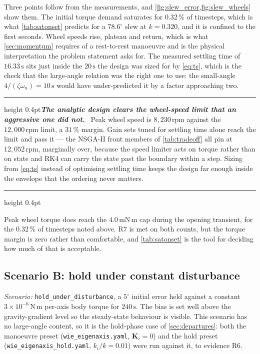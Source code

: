 \documentclass[conference,10pt,a4paper]{IEEEtran}
\newcommand{\remarkrule}{\par\nobreak\vspace{2pt}%
  \hrule height 0.4pt\vspace{4pt}\nobreak}
\newenvironment{keybox}[1][Result]
  {\par\medskip\remarkrule\noindent\small\textbf{\textit{#1.}}\ \ignorespaces}
  {\par\vspace{3pt}\hrule height 0.4pt\par\medskip\ignorespacesafterend}
\newcommand{\mat}[1]{\bm{#1}}
\newcommand{\unit}[1]{\ensuremath{\,\mathrm{#1}}}
\begin{document}
Three points follow from the measurements, and
\cref{fig:slew_error,fig:slew_wheels} show them. The initial torque demand
saturates for $0.32\,\%$ of timesteps, which is what \cref{tab:satonset}
predicts for a $78.6^\circ$ slew at $k=0.320$, and it is confined to the first
seconds. Wheel speeds rise, plateau and return, which is what
\cref{sec:momentum} requires of a rest-to-rest manoeuvre and is the physical
interpretation the problem statement asks for. The measured settling time of
$16.33\unit{s}$ sits just inside the $20\unit{s}$ the design was sized for by
\cref{eq:ts}, which is the check that the large-angle relation was the right
one to use: the small-angle $4/(\zeta\omega_n)=10\unit{s}$ would have
under-predicted it by a factor approaching two.

\begin{keybox}[The analytic design clears the wheel-speed limit that an aggressive one did not]
Peak wheel speed is $8{,}230\unit{rpm}$ against the $12{,}000\unit{rpm}$ limit,
a $31\,\%$ margin. Gain sets tuned for settling time alone reach the limit and
pass it --- the NSGA-II front members of \cref{tab:tradeoff} all pin at
$12{,}052\unit{rpm}$, marginally over, because the speed limiter acts on torque
rather than on state and RK4 can carry the state past the boundary within a
step. Sizing from \cref{eq:ts} instead of optimising settling time keeps the
design far enough inside the envelope that the ordering never matters.
\end{keybox}

Peak wheel torque does reach the $4.0\unit{mN\,m}$ cap during the opening
transient, for the $0.32\,\%$ of timesteps noted above. R7 is met on both
counts, but the torque margin is zero rather than comfortable, and
\cref{tab:satonset} is the tool for deciding how much of that is acceptable.

\subsection{Scenario B: hold under constant disturbance}
\label{sec:scenarioB}

\textit{Scenario:} \texttt{hold\_under\_disturbance}, a $5^\circ$ initial error
held against a constant $3\times10^{-6}\unit{N\,m}$ per-axis body torque for
$240\unit{s}$. The bias is set well above the gravity-gradient level so the
steady-state behaviour is visible. This scenario has no large-angle content,
so it is the hold-phase case of \cref{sec:departures}: both the manoeuvre
preset (\texttt{wie\_eigenaxis.yaml}, $\mat{K}_i=0$) and the hold preset
(\texttt{wie\_eigenaxis\_hold.yaml}, $k_i/k=0.01$) were run against it, to
evidence R6.
\end{document}
